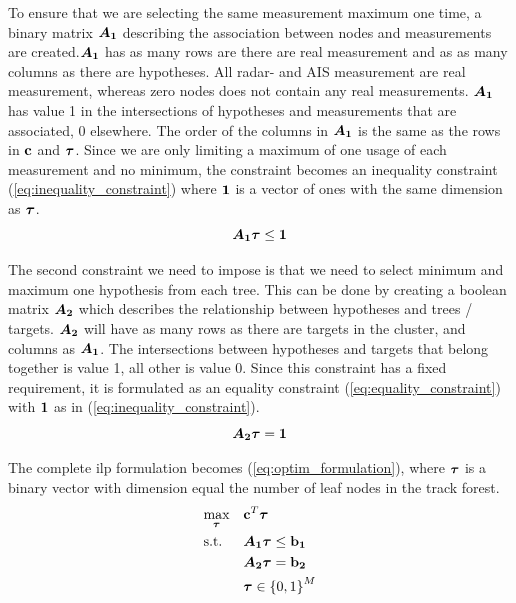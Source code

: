 To ensure that we are selecting the same measurement maximum one time, a binary matrix \( \bm{A_1} \) describing the association between nodes and measurements are created.\(\bm{A_1}\) has as many rows are there are real measurement and as as many columns as there are hypotheses. All radar- and AIS measurement are real measurement, whereas zero nodes does not contain any real measurements. \( \bm{A_1} \) has value 1 in the intersections of hypotheses and measurements that are associated, 0 elsewhere. The order of the columns in \( \bm{A_1} \) is the same as the rows in \( \boldsymbol{\mathbf{c}} \) and \( \boldsymbol{\mathbf{\tau}} \). Since we are only limiting a maximum of one usage of each measurement and no minimum, the constraint becomes an inequality constraint (\ref{eq:inequality_constraint}) where \( \boldsymbol{\mathbf{1}} \) is a vector of ones with the same dimension as \( \boldsymbol{\mathbf{\tau}} \).
\begin{equation}\label{eq:inequality_constraint}
\bm{A_1} \boldsymbol{\mathbf{\tau}} \leq \boldsymbol{\mathbf{1}}
\end{equation}

The second constraint we need to impose is that we need to select minimum and maximum one hypothesis from each tree. This can be done by creating a boolean matrix \( \bm{A_2} \) which describes the relationship between hypotheses and trees / targets. \( \bm{A_2} \) will have as many rows as there are targets in the cluster, and columns as \( \bm{A_1} \). The intersections between hypotheses and targets that belong together is value 1, all other is value 0. Since this constraint has a fixed requirement, it is formulated as an equality constraint (\ref{eq:equality_constraint}) with \( \boldsymbol{\mathbf{1}} \) as in (\ref{eq:inequality_constraint}).
\begin{equation}\label{eq:equality_constraint}
\bm{A_2} \boldsymbol{\mathbf{\tau}} = \boldsymbol{\mathbf{1}}
\end{equation}

The complete \gls{ilp} formulation becomes (\ref{eq:optim_formulation}), where \(\boldsymbol{\mathbf{\tau}}\) is a binary vector with dimension equal the number of leaf nodes in the track forest.
\begin{equation}
\begin{aligned}
&	\underset{\boldsymbol{\mathbf{\tau}}}{\text{max}}
&&	\boldsymbol{\mathbf{c}}^T \boldsymbol{\mathbf{\tau}} \\
&	\text{s.t.}
&&	\bm{A_1} \boldsymbol{\mathbf{\tau}} \leq \boldsymbol{\mathbf{b_1}} 	\\
&&&	\bm{A_2} \boldsymbol{\mathbf{\tau}} = \boldsymbol{\mathbf{b_2}}	\\
&&&	\boldsymbol{\mathbf{\tau}} \in {\{0,1\}}^{M}
\end{aligned}
\label{eq:optim_formulation}
\end{equation}

